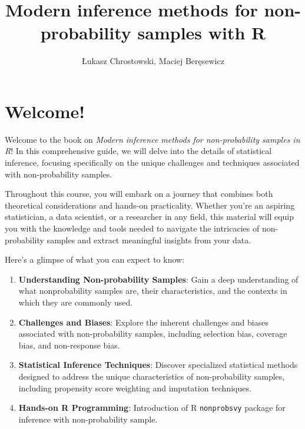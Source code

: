 \documentclass[
  letterpaper,
  DIV=11,
  numbers=noendperiod]{scrreprt}
\title{Modern inference methods for non-probability samples with R}
\author{Łukasz Chrostowski, Maciej Beręsewicz}
\date{}
\renewcommand*\contentsname{Table of contents}
\newcommand\contentsname{Table of contents}
\begin{document}
\maketitle
\ifdefined\Shaded\renewenvironment{Shaded}{\begin{tcolorbox}[boxrule=0pt, frame hidden, sharp corners, interior hidden, borderline west={3pt}{0pt}{shadecolor}, enhanced, breakable]}{\end{tcolorbox}}\fi

\renewcommand*\contentsname{Table of contents}
{
\hypersetup{linkcolor=}
\setcounter{tocdepth}{2}
\tableofcontents
}

\hypertarget{welcome}{%
\chapter{Welcome!}\label{welcome}}

Welcome to the book on \emph{Modern inference methods for
non-probability samples in R}! In this comprehensive guide, we will
delve into the details of statistical inference, focusing specifically
on the unique challenges and techniques associated with non-probability
samples.

Throughout this course, you will embark on a journey that combines both
theoretical considerations and hands-on practicality. Whether you're an
aspiring statistician, a data scientist, or a researcher in any field,
this material will equip you with the knowledge and tools needed to
navigate the intricacies of non-probability samples and extract
meaningful insights from your data.

Here's a glimpse of what you can expect to know:

\begin{enumerate}
\def\labelenumi{\arabic{enumi}.}
\item
  \textbf{Understanding Non-probability Samples}: Gain a deep
  understanding of what nonprobability samples are, their
  characteristics, and the contexts in which they are commonly used.
\item
  \textbf{Challenges and Biases}: Explore the inherent challenges and
  biases associated with non-probability samples, including selection
  bias, coverage bias, and non-response bias.
\item
  \textbf{Statistical Inference Techniques}: Discover specialized
  statistical methods designed to address the unique characteristics of
  non-probability samples, including propensity score weighting and
  imputation techniques.
\item
  \textbf{Hands-on R Programming}: Introduction of R \texttt{nonprobsvy}
  package for inference with non-probability sample.
\end{enumerate}
\end{document}
